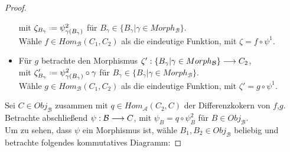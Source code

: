 \documentclass[10pt,a4paper]{report}
\newcommand{\functionfront}[3]{\nolinebreak{#1:#2 \longrightarrow #3}}
\newcommand*{\defeq}{\mathrel{\vcenter{\baselineskip0.5ex \lineskiplimit0pt
                     \hbox{\scriptsize.}\hbox{\scriptsize.}}}%
                     =}
\begin{document}
\begin{proof}
\begin{itemize}
mit $\zeta_{B_{\gamma}} \defeq \psi^2_{\gamma(B_{\gamma})}$ für $B_{\gamma} \in \lbrace B_{\gamma} \vert \gamma \in Morph_{\mathcal{B}}\rbrace$.\\
Wähle $f \in Hom_{\mathcal{B}}(C_1,C_2)$ als die eindeutige Funktion, mit $\zeta = f \circ \psi^1$.
\item[]
Für $g$ betrachte den Morphismus $\functionfront{\zeta'}{\lbrace B_{\gamma} \vert \gamma \in Morph_{\mathcal{B}}\rbrace}{C_2}$,\\
mit $\zeta'_{B_{\gamma}} \defeq \psi^2_{\gamma(B_{\gamma})} \circ \gamma$ für $B_{\gamma} \in \lbrace B_{\gamma} \vert \gamma \in Morph_{\mathcal{B}}\rbrace$.\\
Wähle $g \in Hom_{\mathcal{B}}(C_1,C_2)$ als die eindeutige Funktion, mit $\zeta' = g \circ \psi^1$.
\end{itemize}
\begin{center}
\end{center}
Sei $C \in Obj_{\mathcal{B}}$ zusammen mit $q \in Hom_{\mathcal{A}}(C_2,C)$ der Differenzkokern von $f$,$g$.\\
Betrachte abschließend $\functionfront{\psi}{\mathcal{B}}{C}$, mit $\psi_{B} = q \circ \psi^2_B$ für $B \in Obj_{\mathcal{B}}$.\\
Um zu sehen, dass $\psi$ ein Morphismus ist, wähle $B_1,B_2 \in Obj_{\mathcal{B}}$ beliebig und betrachte folgendes kommutatives Diagramm:

\end{proof}
\end{document}
